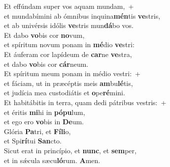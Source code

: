\evenverse Et effúndam super vos aquam mundam,~+\\\evenverse  et mundabímini ab ómnibus inquina\textbf{mén}tis \textbf{ve}stris,~\*\\
\evenverse et ab univérsis idólis \textbf{ve}stris mun\textbf{dá}bo vos.\\
\oddverse Et dabo \textbf{vo}bis cor \textbf{no}vum,~\*\\
\oddverse et spíritum novum ponam in \textbf{mé}dio \textbf{ve}stri:\\
\evenverse Et áuferam cor lapídeum de \textbf{car}ne \textbf{ve}stra,~\*\\
\evenverse et dabo \textbf{vo}bis cor \textbf{cár}neum.\\
\oddverse Et spíritum meum ponam in médio vestri:~+\\
\oddverse  et fáciam, ut in præcéptis meis \textbf{am}bu\textbf{lé}tis,~\*\\
\oddverse et judícia mea custodiátis et \textbf{o}pe\textbf{ré}mini.\\
\evenverse Et habitábitis in terra, quam dedi pátribus vestris:~+\\
\evenverse  et éritis \textbf{mi}hi in \textbf{pó}\textbf{pu}lum,~\*\\
\evenverse et ego ero \textbf{vo}bis in \textbf{De}um.\\
\oddverse Glória \textbf{Pa}tri, et \textbf{Fí}\textbf{li}o,~\*\\
\oddverse et Spi\textbf{rí}tui \textbf{San}cto.\\
\evenverse Sicut erat in princípio, et \textbf{nunc}, et \textbf{sem}per,~\*\\
\evenverse et in sǽcula sæcu\textbf{ló}rum. \textbf{A}men.\\
